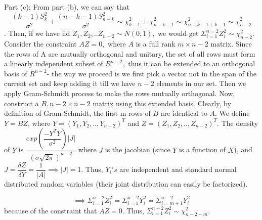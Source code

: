 \documentclass[12pt, oneside]{article}
\begin{document}
\begin{enumerate}
Part (c): From part (b), we can say that
$$\dfrac{(k-1)S_k^2}{\sigma^2} + \dfrac{(n-k-1)S_{n-k}^2}{\sigma^2} \sim \chi_{k-1}^2 + \chi_{n-k-1}^2 \sim \chi_{n-k-1+k-1}^2 \sim \chi_{n-2}^2$$. Then, if we have iid $Z_1,Z_2,..Z_{n-2} \sim N(0,1),$ we would get $\Sigma_{i=1}^{n=2} Z_i^2 \sim \chi_{n-2}^2$. 
\newline Consider the constraint $AZ = 0,$ where $A$ is a full rank $m \times n-2$ matrix. Since the rows of A are mutually orthogonal and unitary, the set of all rows must form a linearly independent subset of $R^{n-2},$ thus it can be extended to an orthogonal basis of $R^{n-2}$- the way we proceed is we first pick a vector not in the span of the current set and keep adding it till we have $n-2$ elements in our set. Then we apply Gram-Schmidt process to make the rows mutually orthogonal. Now, construct a $B, n-2\times n-2$ matrix using this extended basis. Clearly, by definition of Gram Schmidt, the first m rows of $B$ are identical to $A$. 
We define $Y = BZ$, where $Y = (Y_1, Y_2, .., Y_{n-2})^T$ and $Z = (Z_1,Z_2,..,Z_{n-2})^T$. 
The density of $Y$ is $\dfrac{exp(\dfrac{-Y^TY}{\sigma^2})|J|}{(\sigma \sqrt{2\pi})^{n-2}}$ where $J$ is the jacobian (since $Y$ is a function of $X$), and $J = \dfrac{ \delta Z}{\delta Y} = \dfrac{1}{|A|} \implies |J| = 1$. Thus, $Y_i's$ are independent and standard normal distributed random variables (their joint distribution can easily be factorized). 

$$\implies \Sigma_{i=1}^{n-2} Z_i^2 = \Sigma_{i=1}^{n-2} Y_i^2 = \Sigma_{i=m+1}^{n-2} Y_i^2$$ because of the constraint that $AZ=0$. 
Thus, $\Sigma_{i=1}^{n-2} Z_i^2 \sim \chi_{n-2-m}^2$.


\end{enumerate}
\end{document}
